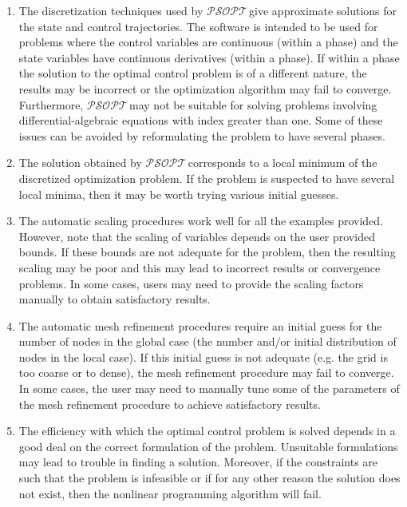 \documentclass[a4paper,11pt]{report}    %
\newcommand{\psopt}{$\mathcal{PSOPT}$\,}  %
\begin{document}
\begin{enumerate}
 \item   The discretization techniques used by \psopt give approximate solutions
for the state and control trajectories. The software is intended to be used for problems where  the control variables are
continuous (within a phase) and the state variables have continuous derivatives (within a phase). If within a phase the solution to the optimal
control problem is of a different nature, the results may be incorrect or the optimization algorithm may fail 
to converge.  Furthermore,  \psopt may  not be suitable for solving problems involving differential-algebraic equations with index greater than
one. Some of these issues can be avoided by reformulating the problem to have several phases.

\item The solution obtained by \psopt corresponds to a local minimum of the discretized optimization problem. If the
problem is suspected to have several local minima, then it may be worth trying various initial guesses.

\item The automatic scaling procedures work well for all the examples provided. However, note that the  scaling of
variables depends on the user provided bounds. If these bounds are not adequate for the problem, then the
resulting scaling may be poor and this may lead to incorrect results or convergence problems. In some cases,
users may need to provide the scaling factors manually to obtain satisfactory results.

\item The automatic mesh refinement procedures require an initial guess for the number of nodes in the global
case (the number and/or initial distribution of nodes in the local case). If this initial guess is
not adequate (e.g. the grid is too coarse or to dense), the mesh refinement procedure may fail to converge. 
In some cases, the user may need to manually tune some of the parameters of the mesh refinement procedure
to achieve satisfactory results.

\item The efficiency with which the optimal control problem is solved depends in a good deal on
the correct formulation of the problem. Unsuitable formulations may lead to trouble in finding
a solution. Moreover, if the constraints are such that the problem is infeasible or if for any other reason the solution
does not exist, then the nonlinear programming algorithm will fail.


\end{enumerate}
\end{document}
